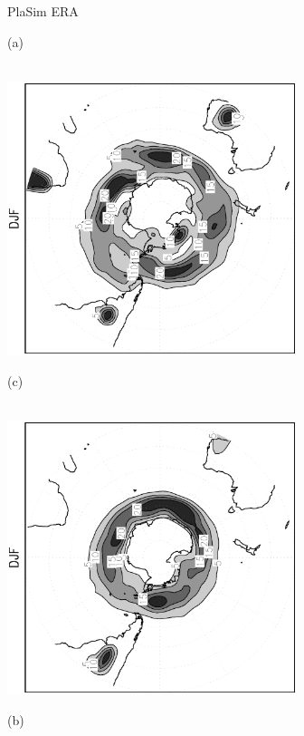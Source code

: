 \documentclass[12pt,a4paper,twoside,openright,headinclude,liststotoc,bibtotoc]{scrreprt}
\begin{document}
\begin{figure}[b]
\hspace{3.8cm}PlaSim \vspace{0.2cm} \hspace{7.3cm} ERA \\
\parbox{8.5cm}{\hspace{0.95cm}\begin{scriptsize}(a)\end{scriptsize} \vspace{-0.5cm} \\
\includegraphics[height=8.0cm,angle=-90]
{eps/cycldensity_PLASIM_T21_45DJF_SH.eps}
}
\parbox{8.5cm}{\hspace{0.95cm}\begin{scriptsize}(c)\end{scriptsize} \vspace{-0.5cm} \\
\includegraphics[height=8.0cm,angle=-90]
{eps/cycldensity_ERA40_T21_45DJF_SH.eps}
}
\parbox{8.5cm}{\hspace{0.95cm}\begin{scriptsize}(b)\end{scriptsize} \vspace{-0.5cm} \\
}
\end{figure}
\end{document}

